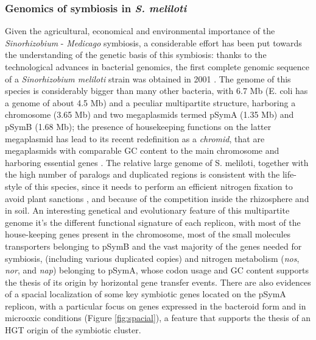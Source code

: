 \subsubsection{Genomics of symbiosis in \textit{S. meliloti}}
\label{sec:genomicsmeliloti}
Given the agricultural, economical and environmental importance of the \textit{Sinorhizobium} - \textit{Medicago} symbiosis, a considerable effort has been put towards the understanding of the genetic basis of this symbiosis: thanks to the technological advances in bacterial genomics, the first complete genomic sequence of a \textit{Sinorhizobium meliloti} strain was obtained in 2001 \cite{galibert2001composite}. The genome of this species is considerably bigger than many other bacteria, with 6.7 Mb (E. coli has a genome of about 4.5 Mb) and a peculiar multipartite structure, harboring a chromosome (3.65 Mb) and two megaplasmids termed pSymA (1.35 Mb) and pSymB (1.68 Mb); the presence of housekeeping functions on the latter megaplasmid has lead to its recent redefinition as a \textit{chromid}, that are megaplasmids with comparable GC content to the main chromosome and harboring essential genes \cite{harrison2010introducing}. The relative large genome of S. meliloti, together with the high number of paralogs and duplicated regions is consistent with the life-style of this species, since it needs to perform an efficient nitrogen fixation to avoid plant sanctions \cite{denison2004most}, and because of the competition inside the rhizosphere and in soil. An interesting genetical and evolutionary feature of this multipartite genome it's the different functional signature of each replicon, with most of the house-keeping genes present in the chromosome, most of the small molecules transporters belonging to pSymB and the vast majority of the genes needed for symbiosis, (including various duplicated copies) and nitrogen metabolism (\textit{nos}, \textit{nor}, and \textit{nap}) belonging to pSymA, whose codon usage and GC content supports the thesis of its origin by horizontal gene transfer events. There are also evidences of a spacial localization of some key symbiotic genes located on the pSymA replicon, with a particular focus on genes expressed in the bacteroid form and in microoxic conditions \cite{becker2004global} (Figure \ref{fig:spacial}), a feature that supports the thesis of an HGT origin of the symbiotic cluster. 


